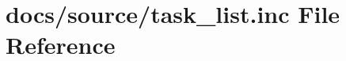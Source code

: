 \hypertarget{task__list_8inc}{}\section{docs/source/task\+\_\+list.inc File Reference}
\label{task__list_8inc}
